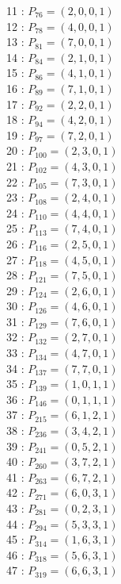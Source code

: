 \documentclass{article}
\begin{document}
{\begin{multicols}{3}
11 : $P_{76}=( 2, 0, 0, 1 )$\\
12 : $P_{78}=( 4, 0, 0, 1 )$\\
13 : $P_{81}=( 7, 0, 0, 1 )$\\
14 : $P_{84}=( 2, 1, 0, 1 )$\\
15 : $P_{86}=( 4, 1, 0, 1 )$\\
16 : $P_{89}=( 7, 1, 0, 1 )$\\
17 : $P_{92}=( 2, 2, 0, 1 )$\\
18 : $P_{94}=( 4, 2, 0, 1 )$\\
19 : $P_{97}=( 7, 2, 0, 1 )$\\
20 : $P_{100}=( 2, 3, 0, 1 )$\\
21 : $P_{102}=( 4, 3, 0, 1 )$\\
22 : $P_{105}=( 7, 3, 0, 1 )$\\
23 : $P_{108}=( 2, 4, 0, 1 )$\\
24 : $P_{110}=( 4, 4, 0, 1 )$\\
25 : $P_{113}=( 7, 4, 0, 1 )$\\
26 : $P_{116}=( 2, 5, 0, 1 )$\\
27 : $P_{118}=( 4, 5, 0, 1 )$\\
28 : $P_{121}=( 7, 5, 0, 1 )$\\
29 : $P_{124}=( 2, 6, 0, 1 )$\\
30 : $P_{126}=( 4, 6, 0, 1 )$\\
31 : $P_{129}=( 7, 6, 0, 1 )$\\
32 : $P_{132}=( 2, 7, 0, 1 )$\\
33 : $P_{134}=( 4, 7, 0, 1 )$\\
34 : $P_{137}=( 7, 7, 0, 1 )$\\
35 : $P_{139}=( 1, 0, 1, 1 )$\\
36 : $P_{146}=( 0, 1, 1, 1 )$\\
37 : $P_{215}=( 6, 1, 2, 1 )$\\
38 : $P_{236}=( 3, 4, 2, 1 )$\\
39 : $P_{241}=( 0, 5, 2, 1 )$\\
40 : $P_{260}=( 3, 7, 2, 1 )$\\
41 : $P_{263}=( 6, 7, 2, 1 )$\\
42 : $P_{271}=( 6, 0, 3, 1 )$\\
43 : $P_{281}=( 0, 2, 3, 1 )$\\
44 : $P_{294}=( 5, 3, 3, 1 )$\\
45 : $P_{314}=( 1, 6, 3, 1 )$\\
46 : $P_{318}=( 5, 6, 3, 1 )$\\
47 : $P_{319}=( 6, 6, 3, 1 )$\\

\end{multicols}}
\end{document}
